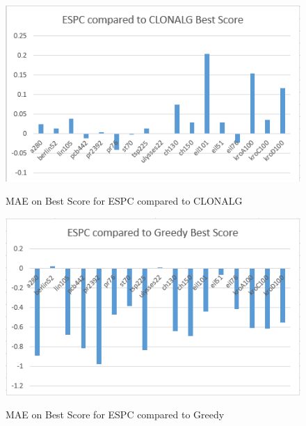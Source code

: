 \begin{figure}[H]
	\includegraphics[]{Images/ESPC_Fig_Best.png}
	\label{ESCP_Best}
	\caption{MAE on Best Score for ESPC compared to CLONALG}
\end{figure}
\begin{figure}[H]
	\includegraphics[]{Images/ESPC_Fig_Greedy.png}
	\label{ESCP_Greedy}
	\caption{MAE on Best Score for ESPC compared to Greedy}
\end{figure}
